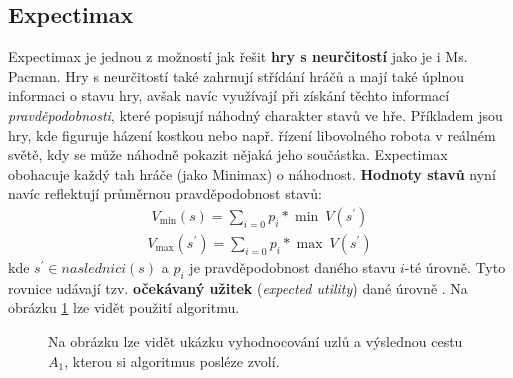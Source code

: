 \subsection{Expectimax}
Expectimax \cite{mas} je jednou z možností jak řešit \textbf{hry s neurčitostí} jako je i Ms. Pacman. Hry s neurčitostí také zahrnují střídání hráčů a mají také úplnou informaci o stavu hry, avšak navíc využívají při získání těchto informací \textit{pravděpodobnosti}, které popisují náhodný charakter stavů ve hře. Příkladem jsou hry, kde figuruje házení kostkou nebo např. řízení libovolného robota v reálném světě, kdy se může náhodně pokazit nějaká jeho součástka. Expectimax obohacuje každý tah hráče (jako Minimax) o náhodnost. \textbf{Hodnoty stavů} nyní navíc reflektují průměrnou pravděpodobnost stavů:
\begin{align}
V_{\min}(s) = \sum_{i=0} p_i * \min \: V(s^\prime)
\end{align}
\begin{align}
V_{\max}(s^\prime) = \sum_{i=0} p_i * \max \: V(s^\prime)
\end{align}
kde $s^\prime \in naslednici(s)$ a $p_i$ je pravděpodobnost daného stavu $i$-té úrovně.
\newline
Tyto rovnice udávají tzv. \textbf{očekávaný užitek} (\textit{expected utility}) dané úrovně \cite{mas}. Na obrázku \ref{img:expectimax} lze vidět použití algoritmu.

\begin{figure}[h]
\begin{center}
  \caption{Na obrázku lze vidět ukázku vyhodnocování uzlů a výslednou cestu $A_1$, kterou si algoritmus posléze zvolí.}
  \label{img:expectimax}
\end{center}
\end{figure}

